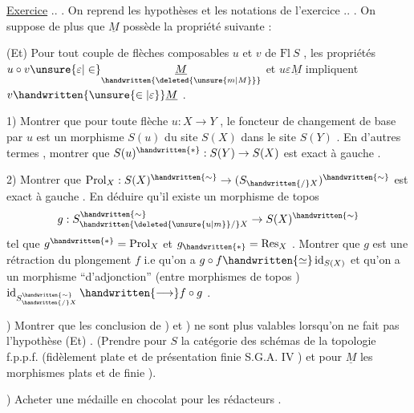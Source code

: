\uline{Exercice} .. . On reprend les hypothèses et les notations de l'exercice .. . On suppose de plus que \(\underline{M}\) possède la propriété suivante :

(Et) Pour tout couple de flèches composables \(u\) et \(v\) de \(\mathrm{Fl}\ S\) , les  propriétés \(u\circ v\unsure{\varepsilon|\in}\underset{\handwritten{\deleted{\unsure{m|M}}}}{\underline{M}}\) et \(u\varepsilon\underline{M}\) impliquent \(v\handwritten{\unsure{\in|\varepsilon}}\underline{M}\) .

1) Montrer que pour toute flèche \(u:X\to Y\) , le foncteur de changement de base par \(u\) est un morphisme  \(S(u)\) du site \(S(X)\) dans le site \(S(Y)\) . En d'autres termes , montrer que \(S(u)^{\handwritten{*}}:S(Y)\to S(X)\) est exact à gauche .

2) Montrer que \(\operatorname{Prol}_X:S(X)^{\handwritten{\sim}}\to(S_{\handwritten{/}X})^{\handwritten{\sim}}\) est exact à gauche . En déduire qu'il existe un morphisme de topos
\[
g:S^{\handwritten{\sim}}_{\handwritten{\deleted{\unsure{u|m}}/}X}\to S(X)^{\handwritten{\sim}}
\]
tel que \(g^{\handwritten{*}}=\operatorname{Prol}_X\) et \(g_{\handwritten{*}}=\operatorname{Res}_X\) . Montrer que \(g\) est une rétraction du plongement \(f\) i.e qu'on a \(g\circ f\handwritten{\simeq}\operatorname{id}_{S(X)}\) et qu'on a un morphisme ``d'adjonction'' (entre morphismes de topos ) \(\operatorname{id}_{S^{\handwritten{\sim}}_{\handwritten{/}X}}\handwritten{\longrightarrow} f\circ g\) .

) Montrer que les conclusion de ) et ) ne sont plus valables lorsqu'on ne fait pas l'hypothèse (Et) . (Prendre pour \(S\) la catégorie des schémas  de la topologie f.p.p.f. (fidèlement plate et de présentation finie \handwritten{[} S.G.A.  IV \handwritten{]} ) et pour \(\underline{M}\) les morphismes  plats et de  finie ).

) Acheter une médaille en chocolat pour les rédacteurs .
